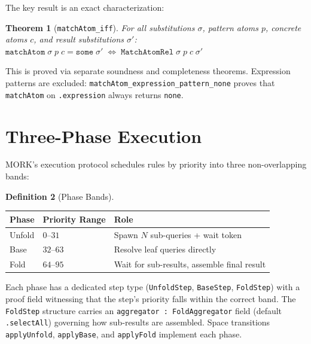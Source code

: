 \documentclass[11pt]{article}
\newtheorem{theorem}{Theorem}[section]
\theoremstyle{definition}
\newtheorem{definition}[theorem]{Definition}
\theoremstyle{remark}
\newcommand{\MORK}{\textup{MORK}}
\begin{document}
The key result is an exact characterization:

\begin{theorem}[\texttt{matchAtom\_iff}]
For all substitutions $\sigma$, pattern atoms $p$, concrete atoms $c$, and
result substitutions $\sigma'$:
$
  \mathtt{matchAtom}\;\sigma\;p\;c = \mathtt{some}\;\sigma'
  \;\iff\;
  \mathtt{MatchAtomRel}\;\sigma\;p\;c\;\sigma'
$
\end{theorem}

\noindent
This is proved via separate soundness and completeness theorems.
Expression patterns are excluded: \texttt{matchAtom\_expression\_pattern\_none}
proves that \texttt{matchAtom} on \texttt{.expression} always returns
\texttt{none}.

\section{Three-Phase Execution}
\label{sec:threephase}

\MORK{}'s execution protocol schedules rules by priority into three
non-overlapping bands:

\begin{definition}[Phase Bands]
\begin{center}
\begin{tabular}{@{}lll@{}}
\toprule
\textbf{Phase} & \textbf{Priority Range} & \textbf{Role} \\
\midrule
Unfold & $0$--$31$   & Spawn $N$ sub-queries + wait token \\
Base   & $32$--$63$  & Resolve leaf queries directly \\
Fold   & $64$--$95$  & Wait for sub-results, assemble final result \\
\bottomrule
\end{tabular}
\end{center}
\end{definition}

Each phase has a dedicated step type (\texttt{UnfoldStep}, \texttt{BaseStep},
\texttt{FoldStep}) with a proof field witnessing that the step's priority
falls within the correct band.
The \texttt{FoldStep} structure carries an \texttt{aggregator :
FoldAggregator} field (default \texttt{.selectAll}) governing how
sub-results are assembled.
Space transitions \texttt{applyUnfold}, \texttt{applyBase}, and
\texttt{applyFold} implement each phase.
\end{document}
